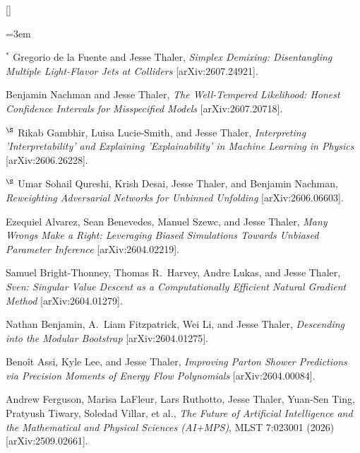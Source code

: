 \setcounter{jessecount}{147}

\begin{list}{[]\addtocounter{jessecount}{-1}}{\leftmargin=3em \itemsep=4pt}

\item
${}^\ast$ Gregorio de la Fuente and Jesse Thaler,
\emph{Simplex Demixing: Disentangling Multiple Light-Flavor Jets at Colliders}
[arXiv:2607.24921].

\item
 Benjamin Nachman and Jesse Thaler,
\emph{The Well-Tempered Likelihood: Honest Confidence Intervals for Misspecified Models}
[arXiv:2607.20718].

\item
${}^\S$ Rikab Gambhir, Luisa Lucie-Smith, and Jesse Thaler,
\emph{Interpreting 'Interpretability' and Explaining 'Explainability' in Machine Learning in Physics}
[arXiv:2606.26228].

\item
${}^\S$ Umar Sohail Qureshi, Krish Desai, Jesse Thaler, and Benjamin Nachman,
\emph{Reweighting Adversarial Networks for Unbinned Unfolding}
[arXiv:2606.06603].

\item
 Ezequiel Alvarez, Sean Benevedes, Manuel Szewc, and Jesse Thaler,
\emph{Many Wrongs Make a Right: Leveraging Biased Simulations Towards Unbiased Parameter Inference}
[arXiv:2604.02219].

\item
 Samuel Bright-Thonney, Thomas R.\ Harvey, Andre Lukas, and Jesse Thaler,
\emph{Sven: Singular Value Descent as a Computationally Efficient Natural Gradient Method}
[arXiv:2604.01279].

\item
 Nathan Benjamin, A.\ Liam Fitzpatrick, Wei Li, and Jesse Thaler,
\emph{Descending into the Modular Bootstrap}
[arXiv:2604.01275].

\item
 Benoît Assi, Kyle Lee, and Jesse Thaler,
\emph{Improving Parton Shower Predictions via Precision Moments of Energy Flow Polynomials}
[arXiv:2604.00084].

\item
 Andrew Ferguson, Marisa LaFleur, Lars Ruthotto, Jesse Thaler, Yuan-Sen Ting, Pratyush Tiwary, Soledad Villar, et al.,
\emph{The Future of Artificial Intelligence and the Mathematical and Physical Sciences (AI+MPS)},
MLST 7:023001 (2026)
[arXiv:2509.02661].


\end{list}
